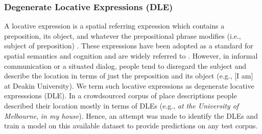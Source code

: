 \documentclass[letter]{sig-alternate}
\begin{document}
\subsubsection{Degenerate Locative Expressions (DLE)}
\label{DLE}
A locative expression is a spatial referring expression which contains a preposition, its object, and whatever the prepositional phrase modifies (i.e., subject of preposition) \cite{herskovits:pragmatics}. These expressions have been adopted as a standard for spatial semantics and cognition and are widely referred to \cite{olivier:semantics,zlatev:semantics}. However, in informal communication or a situated dialog, people tend to disregard the subject and describe the location in terms of just the preposition and its object (e.g., [I am] at Deakin University). We term such locative expressions as degenerate locative expresssions (DLE). In a crowdsourced corpus of place descriptions
\cite{tuw}
people described their location mostly in terms of DLEs (e.g., \textit{at the University of Melbourne}, \textit{in my house}). Hence, an attempt was made to identify the DLEs and train a model on this available dataset to provide predictions on any test corpus.
\end{document}
